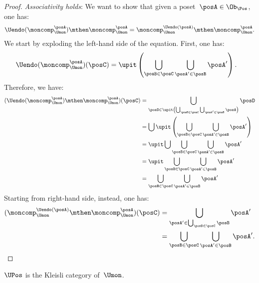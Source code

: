 \begin{proof}
  \emph{Associativity holds}: We want to show that given a poset~$\posA\in \Ob_\Pos$, one has:
  \begin{equation}
    \Uendo(\moncomp_{\Umon}^{\posA})\mthen \moncomp_{\Umon}^{\posA}= \moncomp_{\Umon}^{\Uendo(\posA)}\mthen \moncomp_{\Umon}^{\posA}.
  \end{equation}
  We start by exploding the left-hand side of the equation. First, one has:
  \begin{equation*}
    \begin{aligned}
      \Uendo(\moncomp_{\Umon}^{\posA})(\posC)&=\upit \left( \bigcup_{\posB\in \posC}\bigcup_{\posA'\in \posB} \posA'\right).
    \end{aligned}
  \end{equation*}
  Therefore, we have:
  \begin{equation*}
    \begin{aligned}
      (\Uendo(\moncomp_{\Umon}^{\posA})\mthen \moncomp_{\Umon}^{\posA})(\posC)&=\bigcup_{\posD \in \upit \left( \bigcup_{\posB\in \posC}\bigcup_{\posA'\in \posB} \posA\right)} \posD\\
      &=\bigcup \upit \left( \bigcup_{\posB\in \posC}\bigcup_{\posA'\in \posB} \posA'\right)\\
      &=\upit \bigcup \bigcup_{\posB\in \posC}\bigcup_{\posA'\in \posB} \posA'\\
      &=\upit  \bigcup_{\posB\in \posC}\bigcup_{\posA'\in \posB} \posA'\\
      &= \bigcup_{\posB\in \posC}\bigcup_{\posA'\in \posB} \posA'
    \end{aligned}
  \end{equation*}
  Starting from right-hand side, instead, one has:
  \begin{equation*}
    \begin{aligned}
      (\moncomp_{\Umon}^{\Uendo(\posA)}\mthen \moncomp_{\Umon}^{\posA})(\posC)&=\bigcup_{\posA'\in \bigcup_{\posB\in \posC}\posB}\posA'\\
      &=\bigcup_{\posB\in \posC}\bigcup_{\posA'\in \posB} \posA'.
    \end{aligned}
  \end{equation*}
\end{proof}

\begin{lemma}
\label{lem:uposkleisli}
  $\UPos$ is the Kleisli category of~$\Umon$.
\end{lemma}
